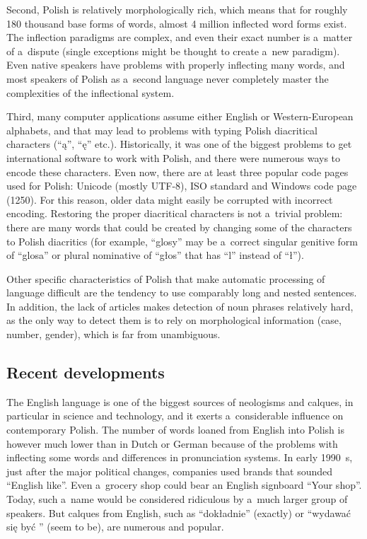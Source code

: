 \begin{multicols}{2}
Second, Polish is relatively morphologically rich, which means that
for roughly 180 thousand base forms of words, almost 4 million
inflected word forms exist. The inflection paradigms are complex, and
even their exact number is a~matter of a~dispute (single exceptions
might be thought to create a~new paradigm). Even native speakers have
problems with properly inflecting many words, and most speakers of
Polish as a~second language never completely master the complexities
of the inflectional system. 


Third, many computer applications assume either English or
Western-European alphabets, and that may lead to problems with typing
Polish diacritical characters (“ą”, “ę” etc.). Historically,
it was one of the biggest problems to get international software to
work with Polish, and there were numerous ways to encode these
characters. Even now, there are at least three popular code pages used
for Polish: Unicode (mostly UTF-8), ISO standard and Windows code page
(1250). For this reason, older data might easily be corrupted with
incorrect encoding. Restoring the proper diacritical characters is not
a~trivial problem: there are many words that could be created by
changing some of the characters to Polish diacritics (for example,
“glosy” may be a~correct singular genitive form of “glosa” or
plural nominative of “głos” that has “l” instead of
“ł”). 

Other specific characteristics of Polish that make automatic
processing of language difficult are the tendency to use comparably
long and nested sentences. In addition, the lack of articles makes
detection of noun phrases relatively hard, as the only way to detect
them is to rely on morphological information (case, number, gender),
which is far from unambiguous. 

\subsection[Recent developments]{Recent developments} 

The English language is one of the biggest sources of neologisms and
calques, in particular in science and technology, and it exerts
a~considerable influence on contemporary Polish. The number of words
loaned from English into Polish is however much lower than in Dutch or
German because of the problems with inflecting some words and
differences in pronunciation systems. In early 1990~s, just after the
major political changes, companies used brands that sounded “English
like”. Even a~grocery shop could bear an English signboard “Your
shop”. Today, such a~name would be considered ridiculous by a~much
larger group of speakers. But calques from English, such as
“dokładnie” (exactly) or “wydawać się być ” (seem to be),
are numerous and popular. 


\end{multicols}
